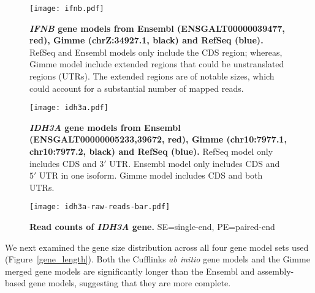 \clearpage\pagestyle{lscape}
\begin{landscape}
\begin{figure}[!ht]
    \begin{center}
        \texttt{[image: ifnb.pdf]}
    \end{center}
    \caption{
        \textbf{{\em IFNB} gene models from Ensembl
        (ENSGALT00000039477, red), Gimme (chrZ:34927.1, black)
        and RefSeq (blue).}
        RefSeq and Ensembl models only include the CDS region;
        whereas, Gimme model include extended regions that could
        be unstranslated regions (UTRs). The extended regions are
        of notable sizes, which could account for a substantial
        number of mapped reads.
    }
    \label{ifnb}
\end{figure}

\begin{figure}[!ht]
    \begin{center}
        \texttt{[image: idh3a.pdf]}
    \end{center}
    \caption{
        \textbf{{\em IDH3A} gene models from Ensembl
        (ENSGALT00000005233,39672, red), Gimme
        (chr10:7977.1, chr10:7977.2, black) and RefSeq (blue).}
        RefSeq model only includes CDS and $3\prime$ UTR. Ensembl
        model only includes CDS and $5\prime$ UTR in one isoform.
        Gimme model includes CDS and both UTRs.
    }
    \label{idh3a}
\end{figure}
\end{landscape}
\pagestyle{plain}

\begin{figure}[!ht]
    \begin{center}
        \texttt{[image: idh3a-raw-reads-bar.pdf]}
    \end{center}
    \caption{
        \textbf{Read counts of {\em IDH3A} gene.} SE=single-end, PE=paired-end
    }
    \label{idh3a_count}
\end{figure}

We next examined the gene size distribution across all four
gene model sets used (Figure~\ref{gene_length}).  Both the
Cufflinks {\em ab initio} gene models and the Gimme merged
gene models are significantly longer than the Ensembl and
assembly-based gene models, suggesting that they are more
complete.

